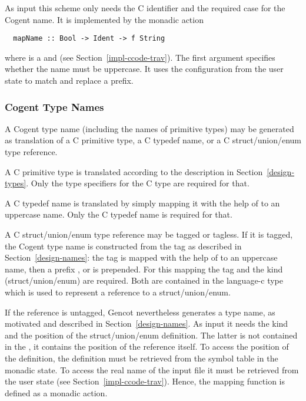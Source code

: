 As input this scheme only needs the C identifier and the required case for the Cogent name.
It is implemented by the monadic action
\begin{verbatim}
  mapName :: Bool -> Ident -> f String
\end{verbatim}
where  is a  and  
(see Section~\ref{impl-ccode-trav}). The first argument specifies whether the name must be uppercase. 
It uses the configuration from the user state to match and replace a prefix.

\subsubsection{Cogent Type Names}

A Cogent type name (including the names of primitive types) may be generated as translation of a C 
primitive type, a C typedef name, or a C struct/union/enum type reference. 

A C primitive type is translated according to the description in Section~\ref{design-types}. Only the
type specifiers for the C type are required for that.

A C typedef name is translated by simply mapping it with the help of  to an uppercase name.
Only the C typedef name is required for that.

A C struct/union/enum type reference may be tagged or tagless. If it is tagged, the Cogent type name is
constructed from the tag as described in Section~\ref{design-names}: the tag is mapped with the help of
 to an uppercase name, then a prefix ,  or  is 
prepended. For this mapping the tag and the kind (struct/union/enum) are required. Both are contained
in the language-c type  which is used to represent a reference to a struct/union/enum.

If the reference is untagged, Gencot nevertheless generates a type name, as motivated and described 
in Section~\ref{design-names}. As input it needs the kind and the position of the struct/union/enum 
definition. The latter is not contained in the , it contains the position of the reference
itself. To access the position of the definition, the definition must be retrieved from the symbol table
in the monadic state. To access the real name of the input file it must be retrieved from the user
state (see Section~\ref{impl-ccode-trav}). Hence, the mapping function is defined as a monadic action. 

